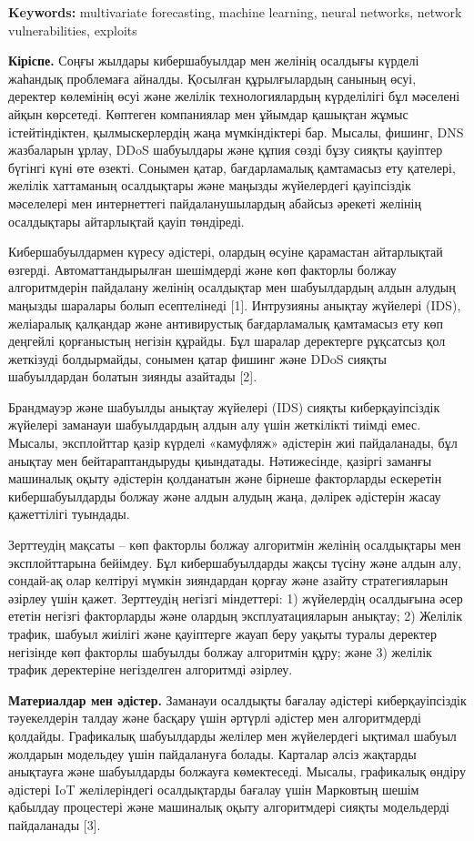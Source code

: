 {\bfseries Keywords:} multivariate forecasting, machine learning, neural
networks, network vulnerabilities, exploits

{\bfseries Кіріспе.} Соңғы жылдары кибершабуылдар мен желінің осалдығы
күрделі жаһандық проблемаға айналды. Қосылған құрылғылардың санының
өсуі, деректер көлемінің өсуі және желілік технологиялардың күрделілігі
бұл мәселені айқын көрсетеді. Көптеген компаниялар мен ұйымдар қашықтан
жұмыс істейтіндіктен, қылмыскерлердің жаңа мүмкіндіктері бар. Мысалы,
фишинг, DNS жазбаларын ұрлау, DDoS шабуылдары және құпия сөзді бұзу
сияқты қауіптер бүгінгі күні өте өзекті. Сонымен қатар, бағдарламалық
қамтамасыз ету қателері, желілік хаттаманың осалдықтары және маңызды
жүйелердегі қауіпсіздік мәселелері мен интернеттегі пайдаланушылардың
абайсыз әрекеті желінің осалдықтары айтарлықтай қауіп төндіреді.

Кибершабуылдармен күресу әдістері, олардың өсуіне қарамастан айтарлықтай
өзгерді. Автоматтандырылған шешімдерді және көп факторлы болжау
алгоритмдерін пайдалану желінің осалдықтар мен шабуылдардың алдын алудың
маңызды шаралары болып есептелінеді {[}1{]}. Интрузияны анықтау жүйелері
(IDS), желіаралық қалқандар және антивирустық бағдарламалық қамтамасыз
ету көп деңгейлі қорғаныстың негізін құрайды. Бұл шаралар деректерге
рұқсатсыз қол жеткізуді болдырмайды, сонымен қатар фишинг және DDoS
сияқты шабуылдардан болатын зиянды азайтады {[}2{]}.

Брандмауэр және шабуылды анықтау жүйелері (IDS) сияқты киберқауіпсіздік
жүйелері заманауи шабуылдардың алдын алу үшін жеткілікті тиімді емес.
Мысалы, эксплойттар қазір күрделі «камуфляж» әдістерін жиі пайдаланады,
бұл анықтау мен бейтараптандыруды қиындатады. Нәтижесінде, қазіргі
заманғы машиналық оқыту әдістерін қолданатын және бірнеше факторларды
ескеретін кибершабуылдарды болжау және алдын алудың жаңа, дәлірек
әдістерін жасау қажеттілігі туындады.

Зерттеудің мақсаты -- көп факторлы болжау алгоритмін желінің осалдықтары
мен эксплойттарына бейімдеу. Бұл кибершабуылдарды жақсы түсіну және
алдын алу, сондай-ақ олар келтіруі мүмкін зияндардан қорғау және азайту
стратегияларын әзірлеу үшін қажет. Зерттеудің негізгі міндеттері: 1)
жүйелердің осалдығына әсер ететін негізгі факторларды және олардың
эксплуатацияларын анықтау; 2) Желілік трафик, шабуыл жиілігі және
қауіптерге жауап беру уақыты туралы деректер негізінде көп факторлы
шабуылды болжау алгоритмін құру; және 3) желілік трафик деректеріне
негізделген алгоритмді әзірлеу.

{\bfseries Материалдар мен әдістер.} Заманауи осалдықты бағалау әдістері
киберқауіпсіздік тәуекелдерін талдау және басқару үшін әртүрлі әдістер
мен алгоритмдерді қолдайды. Графикалық шабуылдарды желілер мен
жүйелердегі ықтимал шабуыл жолдарын модельдеу үшін пайдалануға болады.
Карталар әлсіз жақтарды анықтауға және шабуылдарды болжауға көмектеседі.
Мысалы, графикалық өндіру әдістері IoT желілеріндегі осалдықтарды
бағалау үшін Марковтың шешім қабылдау процестері және машиналық оқыту
алгоритмдері сияқты модельдерді пайдаланады {[}3{]}.


